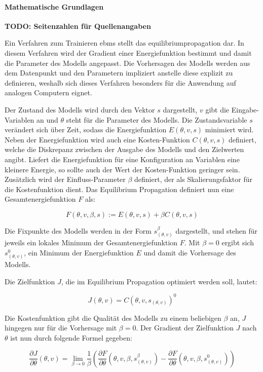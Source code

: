 \paragraph{Mathematische Grundlagen}

\textbf{TODO: Seitenzahlen für Quellenangaben}

Ein Verfahren zum Trainieren \glspl{ebm} stellt das \gls{equilibriumpropagation} dar. In diesem Verfahren wird der Gradient einer Energiefunktion bestimmt und damit die Parameter des Modells angepasst. Die Vorhersagen des Modells werden aus dem Datenpunkt und den Parametern impliziert anstelle diese explizit zu definieren, weshalb sich dieses Verfahren besonders für die Anwendung auf analogen Computern eignet. \cite{Scellier2017}

Der Zustand des Modells wird durch den Vektor \(s\) dargestellt, \(v\) gibt die Eingabe-Variablen an und \(\theta\) steht für die Parameter des Modells. Die Zustandsvariable \(s\) verändert sich über Zeit, sodass die Energiefunktion \(E(\theta,v,s)\) minimiert wird. Neben der Energiefunktion wird auch eine Kosten-Funktion \(C(\theta,v,s)\) definiert, welche die Diskrepanz zwischen der Ausgabe des Modells und den Zielwerten angibt. Liefert die Energiefunktion für eine Konfiguration an Variablen eine kleinere Energie, so sollte auch der Wert der Kosten-Funktion geringer sein. Zusätzlich wird der Einfluss-Parameter \(\beta\) definiert, der als Skalierungsfaktor für die Kostenfunktion dient. Das Equilibrium Propagation definiert nun eine Gesamtenergiefunktion \(F\) als:

\[F(\theta,v,\beta,s):=E(\theta,v,s)+\beta C(\theta,v,s)\]

Die Fixpunkte des Modells werden in der Form \(s_{(\theta,v)}^\beta\) dargestellt, und stehen für jeweils ein lokales Minimum der Gesamtenergiefunktion \(F\). Mit \(\beta=0\) ergibt sich \(s_{(\theta,v)}^0\), ein Minimum der Energiefunktion \(E\) und damit die Vorhersage des Modells. \cite{Scellier2017}

Die Zielfunktion \(J\), die im Equilibrium Propagation optimiert werden soll, lautet:

\[J(\theta,v)=C(\theta,v,s_{(\theta,v)})^0\]

Die Kostenfunktion gibt die Qualität des Modells zu einem beliebigen \(\beta\) an, \(J\) hingegen nur für die Vorhersage mit \(\beta=0\). Der Gradient der Zielfunktion \(J\) nach \(\theta\) ist nun durch folgende Formel gegeben:

\[\frac{\partial J}{\partial \theta}(\theta,v)=\lim\limits_{\beta \to 0}\frac{1}{\beta}\left(\frac{\partial F}{\partial \theta}(\theta,v,\beta,s_{(\theta,v)}^\beta)-\frac{\partial F}{\partial \theta}(\theta,v,\beta,s_{(\theta,v)}^0)\right)\]

